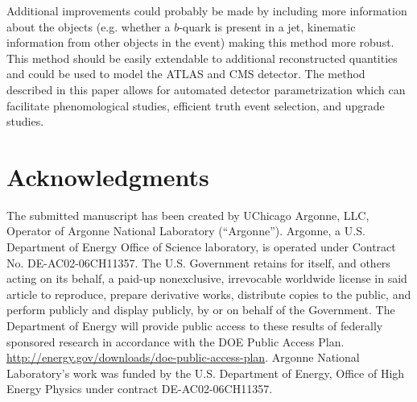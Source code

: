 \documentclass[showpacs,showkeys,preprint,prd,nofootinbib,linenumbers,12pt,superscriptaddress]{revtex4-1}
\begin{document}
Additional improvements could probably be made by including more information about the objects (e.g. whether a $b$-quark is present in a jet, kinematic information from other objects in the event) making this method more robust. This method should be easily extendable to additional reconstructed quantities and could be used to model the ATLAS and CMS detector. The method described in this paper allows for automated detector parametrization which can facilitate phenomological studies, efficient truth event selection, and upgrade studies.

\section*{Acknowledgments}
The submitted manuscript has been created by UChicago Argonne, LLC, Operator of Argonne National Laboratory (“Argonne”). Argonne, a U.S.  Department of Energy Office of Science laboratory, is operated under Contract No. DE-AC02-06CH11357. The U.S. Government retains for itself, 
and others acting on its behalf, a paid-up nonexclusive, irrevocable worldwide license in said article to reproduce, prepare derivative works, distribute copies to the public, and perform publicly and display publicly, by or on behalf of the Government.  The Department of Energy will provide public access to these results of federally sponsored research in accordance with the 
DOE Public Access Plan. \url{http://energy.gov/downloads/doe-public-access-plan}. Argonne National Laboratory’s work was funded by the U.S. Department of Energy, Office of High Energy Physics under contract DE-AC02-06CH11357. 



\end{document}
